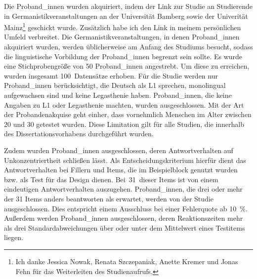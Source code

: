 Die Proband\_innen wurden akquiriert, indem der Link zur Studie an Studierende in Germanistikveranstaltungen an der Universität Bamberg sowie der Univerität Mainz\footnote{Ich danke Jessica Nowak, Renata Szczepaniak, Anette Kremer und Jonas Fehn für das Weiterleiten des Studienaufrufs.} geschickt wurde. Zusätzlich habe ich den Link in meinem persönlichen Umfeld verbreitet. Die Germanistikveranstaltungen, in denen Proband\_innen akquiriert wurden, werden üblicherweise am Anfang des Studiums besucht, sodass die linguistische Vorbildung der Proband\_innen begrenzt sein sollte. Es wurde eine Stichprobengröße von 50 Proband\_innen angestrebt. Um diese zu erreichen, wurden insgesamt 100~Datensätze erhoben. Für die Studie werden nur Pro\-\mbox{band\_in}\-nen berücksichtigt, die Deutsch als L1 sprechen, monolingual aufgewachsen sind und keine Legasthenie haben. Proband\_innen, die keine Angaben zu L1 oder Legasthenie machten, wurden ausgeschlossen. Mit der Art der Probandenakquise geht einher, dass vornehmlich Menschen im Alter zwischen 20 und 30 getestet wurden. Diese Limitation gilt für alle Studien, die innerhalb des Dissertationsvorhabens durchgeführt wurden.



Zudem wurden Proband\_innen ausgeschlossen, deren Antwortverhalten auf Unkonzentriertheit schließen lässt. Als Entscheidungskriterium hierfür dient das Antwortverhalten bei Fillern und Items, die im Beispielblock genutzt wurden bzw. als Test für das Design dienen. Bei~31~dieser Items ist von einem eindeutigen Antwortverhalten auszugehen. Proband\_innen, die drei oder mehr der 31 Items anders beantworten als erwartet, werden von der Studie ausgeschlossen. Dies entspricht einem Ausschluss bei einer Fehlerquote ab 10~\%. Außerdem werden Proband\_innen ausgeschlossen, deren Reaktionszeiten mehr als drei Standardabweichungen über oder unter dem Mittelwert eines Testitems liegen. 

